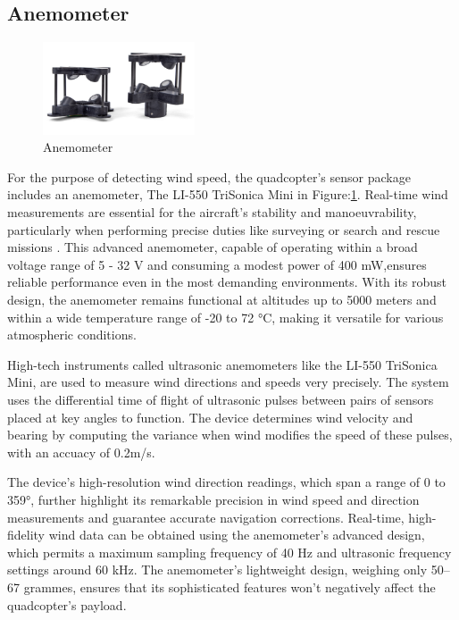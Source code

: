 \documentclass{report}
\begin{document}
\subsection{Anemometer}
\begin{figure}[H]
  \centering
  \includegraphics[width=0.4\textwidth]{Pictures/Anemometer.png}
  \caption{Anemometer}
  \label{fig:Anemometer}
\end{figure}

For the purpose of detecting wind speed, the quadcopter's sensor package
includes an anemometer, The LI-550 TriSonica Mini in
Figure:\ref{fig:Anemometer}. Real-time wind measurements are essential for the
aircraft's stability and manoeuvrability, particularly when performing precise
duties like surveying or search and rescue missions \cite{uav_wilderness_sar}.
This advanced anemometer, capable of operating within a broad voltage range of 5
- 32 V and consuming a modest power of 400 mW,ensures reliable performance even
in the most demanding environments. With its robust design, the anemometer
remains functional at altitudes up to 5000 meters and within a wide temperature
range of -20 to 72 °C, making it versatile for various atmospheric conditions.

High-tech instruments called ultrasonic anemometers like the LI-550 TriSonica
Mini, are used to measure wind directions and speeds very precisely. The system
uses the differential time of flight of ultrasonic pulses between pairs of
sensors placed at key angles to function. The device determines wind velocity
and bearing by computing the variance when wind modifies the speed of these
pulses, with an accuacy of 0.2m/s.

The device's high-resolution wind direction readings, which span a range of 0 to
359°, further highlight its remarkable precision in wind speed and direction
measurements and guarantee accurate navigation corrections. Real-time,
high-fidelity wind data can be obtained using the anemometer's advanced design,
which permits a maximum sampling frequency of 40 Hz and ultrasonic frequency
settings around 60 kHz. The anemometer's lightweight design, weighing only 50–67
grammes, ensures that its sophisticated features won't negatively affect the
quadcopter's payload.
\end{document}
